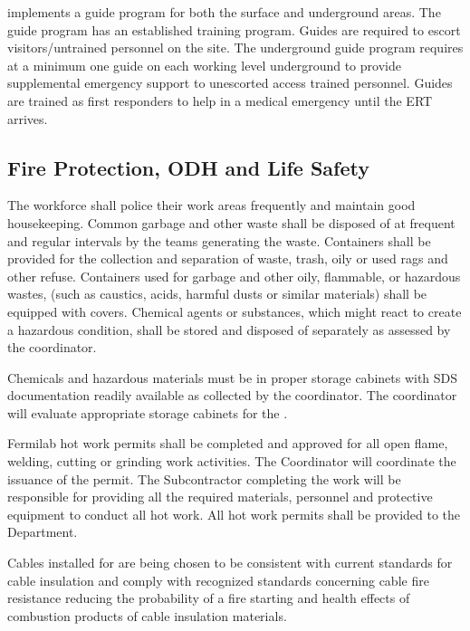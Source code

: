  implements a guide program for both the surface and
underground areas. The guide program has an established training
program. Guides are required to escort visitors/untrained personnel on
the  site. The underground guide program requires at a
minimum one guide on each working level underground to provide
supplemental emergency support to unescorted access trained
personnel. Guides are trained as first responders to help in a medical
emergency until the ERT arrives.

\subsection{Fire Protection, ODH and Life Safety}

The workforce shall police their work areas frequently and maintain
good housekeeping. Common garbage and other waste shall be disposed of
at frequent and regular intervals by the teams generating the
waste. Containers shall be provided for the collection and separation
of waste, trash, oily or used rags and other refuse.  Containers used
for garbage and other oily, flammable, or hazardous wastes, (such as
caustics, acids, harmful dusts or similar materials) shall be equipped
with covers.  Chemical agents or substances, which might react to
create a hazardous condition, shall be stored and disposed of
separately as assessed by the  
coordinator.

Chemicals and hazardous materials must be in proper storage cabinets
with SDS documentation readily available as collected by the
  coordinator. The
  coordinator will evaluate
appropriate storage cabinets for the .

Fermilab hot work permits shall be completed and approved for all open
flame, welding, cutting or grinding work activities.  The 
 Coordinator will coordinate the issuance of the permit.
The Subcontractor completing the work will be responsible for
providing all the required materials, personnel and protective
equipment to conduct all hot work. All hot work permits shall be
provided to the   Department.

Cables installed for  are being chosen to be
consistent with current \fnal standards for cable insulation and
comply with recognized standards concerning cable fire resistance
reducing the probability of a fire starting and health effects of
combustion products of cable insulation materials.

